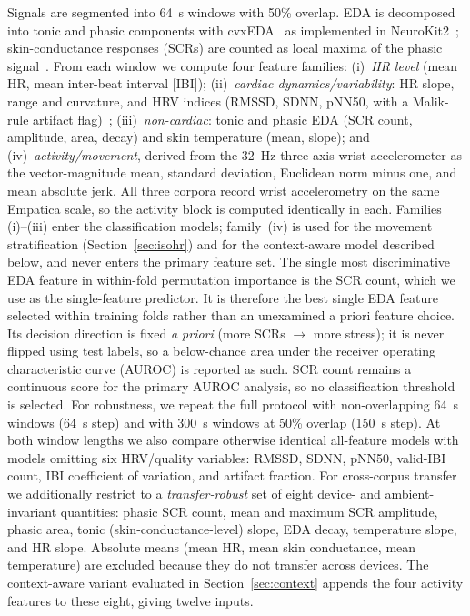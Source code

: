 \documentclass[healthcare,article,submit,moreauthors,pdftex]{Definitions/mdpi}
\begin{document}
Signals are segmented into 64~s windows with 50\% overlap. EDA is decomposed into
tonic and phasic components with cvxEDA~\cite{greco2016cvxeda} as implemented in
NeuroKit2~\cite{makowski2021neurokit}; skin-conductance responses (SCRs) are
counted as local maxima of the phasic signal~\cite{benedek2010phasic}. From each
window we compute four feature families: (i)~\emph{HR level} (mean HR, mean
inter-beat interval [IBI]); (ii)~\emph{cardiac dynamics/variability}: HR slope, range
and curvature, and HRV indices (RMSSD, SDNN, pNN50, with a Malik-rule artifact
flag)~\cite{shaffer2017hrv}; (iii)~\emph{non-cardiac}: tonic and phasic EDA
(SCR count, amplitude, area, decay) and skin temperature (mean, slope); and
(iv)~\emph{activity/movement}, derived from the 32~Hz three-axis wrist
accelerometer as the vector-magnitude mean, standard deviation, Euclidean norm
minus one, and mean absolute jerk. All three corpora record wrist accelerometry
on the same Empatica scale, so the activity block is computed identically in
each. Families (i)--(iii) enter the classification models; family~(iv) is used
for the movement stratification (Section~\ref{sec:isohr}) and for the
context-aware model described below, and never enters the primary feature set.
The
single most discriminative EDA feature in within-fold permutation importance is
the SCR count, which we use as the single-feature predictor. It is therefore the
best single EDA feature selected within training folds rather than an unexamined
a priori feature choice. Its decision
direction is fixed \emph{a priori} (more SCRs $\rightarrow$ more stress); it is
never flipped using test labels, so a below-chance area under the receiver
operating characteristic curve (AUROC) is reported as such. SCR count remains a
continuous score for the primary AUROC analysis, so no classification threshold
is selected. For robustness, we repeat the full protocol with non-overlapping
64~s windows (64~s step) and with 300~s windows at 50\% overlap (150~s step).
At both window lengths we also compare otherwise identical all-feature models
with models omitting six HRV/quality variables: RMSSD, SDNN, pNN50, valid-IBI
count, IBI coefficient of variation, and artifact fraction. For
cross-corpus transfer we additionally restrict to a \emph{transfer-robust} set of
eight device- and ambient-invariant quantities: phasic SCR count, mean and
maximum SCR amplitude, phasic area, tonic (skin-conductance-level) slope, EDA
decay, temperature slope, and HR slope. Absolute means (mean HR, mean skin
conductance, mean temperature) are excluded because they do not transfer across
devices. The context-aware variant evaluated in Section~\ref{sec:context}
appends the four activity features to these eight, giving twelve inputs.
\end{document}
